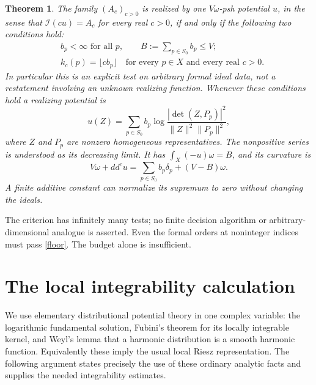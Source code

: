 \documentclass[11pt]{article}
\newtheorem{theorem}{Theorem}
\newcommand{\II}{\mathcal I}
\begin{document}
\begin{theorem}\label{main}
The family $(A_c)_{c>0}$ is realized by one $V\omega$-psh potential $u$, in the sense that $\II(cu)=A_c$ for every real $c>0$, if and only if the following two conditions hold:
\begin{align}
 &b_p<\infty\text{ for all }p,
 \qquad B:=\sum_{p\in S_0}b_p\leq V; \label{budget}\\
 &k_c(p)=\lfloor c b_p\rfloor
 \quad\text{for every }p\in X\text{ and every real }c>0. \label{floor}
\end{align}
In particular this is an explicit test on arbitrary formal ideal data, not a restatement involving an unknown realizing function. Whenever these conditions hold a realizing potential is
\[
 u(Z)=\sum_{p\in S_0}b_p\log
 \frac{|\det(Z,P_p)|^2}{\|Z\|^2\|P_p\|^2},
\]
where $Z$ and $P_p$ are nonzero homogeneous representatives. The nonpositive series is understood as its decreasing limit. It has $\int_X(-u)\omega=B$, and its curvature is
\[
 V\omega+dd^cu=\sum_{p\in S_0}b_p\delta_p+(V-B)\omega.
\]
A finite additive constant can normalize its supremum to zero without changing the ideals.
\end{theorem}

The criterion has infinitely many tests; no finite decision algorithm or arbitrary-dimensional analogue is asserted. Even the formal orders at noninteger indices must pass \eqref{floor}. The budget alone is insufficient.

\section{The local integrability calculation}
We use elementary distributional potential theory in one complex variable: the logarithmic fundamental solution, Fubini's theorem for its locally integrable kernel, and Weyl's lemma that a harmonic distribution is a smooth harmonic function. Equivalently these imply the usual local Riesz representation. The following argument states precisely the use of these ordinary analytic facts and supplies the needed integrability estimates.
\end{document}
